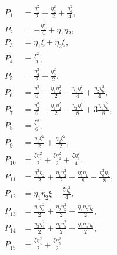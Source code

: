 \documentclass[showpacs,aps,floatfix,prb,reprint,superscriptaddress,onecolumn]{revtex4-1}
\begin{document}
\begin{subequations}
\label{eqn:expansion2detailed} 
\begin{align}
        P_{1} &=\frac{\eta_{1}^2}{2}  + \frac{\eta_{2}^2}{2} + \frac{\eta_{6}^2}{4} ,\\
        P_{2} &=-\frac{\eta_{6}^2}{4} + \eta_{1}\eta_{2} ,\\
				P_{3} &=\eta_{1}\xi + \eta_{2}\xi , \\
				P_{4} &=\frac{\xi^2}{2} , \\
				P_{5} &=\frac{\eta_{4}^2}{2} + \frac{\eta_{5}^2}{2} , \\
				P_{6} &=\frac{\eta_{1}^3}{6} + \frac{\eta_{1}\eta_{2}^2}{2} - \frac{\eta_{1}\eta_{6}^2}{4} + \frac{\eta_{2}\eta_{6}^2}{4} , \\
				P_{7} &=\frac{\eta_{2}^3}{6} - \frac{\eta_{1}\eta_{2}^2}{2} - \frac{\eta_{2}\eta_{6}^2}{8} + 3\frac{\eta_{1}\eta_{6}^2}{8} , \\
				P_{8} &=\frac{\xi^3}{6} , \\
				P_{9} &=\frac{\eta_{1}\xi^2}{2} + \frac{\eta_{2}\xi^2}{2} , \\
				P_{10} &=\frac{\xi \eta_{1}^2}{2} + \frac{\xi \eta_{2}^2}{2} + \frac{\xi \eta_{6}^2}{4} , \\
				P_{11} &=\frac{\eta_{1}^2\eta_{2}}{2} +  \frac{\eta_{1}\eta_{2}^2}{2} - \frac{\eta_{6}^2\eta_{1}}{8} - \frac{\eta_{6}^2\eta_{2}}{8} , \\
				P_{12} &=\eta_{1}\eta_{2}\xi - \frac{\xi\eta_{6}^2}{4} , \\
				P_{13} &=\frac{\eta_{1}\eta_{4}^2}{2} + \frac{\eta_{2}\eta_{5}^2}{2} - \frac{\eta_{4}\eta_{5}\eta_{6}}{2} , \\
				P_{14} &=\frac{\eta_{2}\eta_{4}^2}{2} + \frac{\eta_{1}\eta_{5}^2}{2} + \frac{\eta_{4}\eta_{5}\eta_{6}}{2} , \\
				P_{15} &=\frac{\xi \eta_{4}^2}{2} + \frac{\xi \eta_{5}^2}{2} 
\end{align}
\end{subequations}
\end{document}
